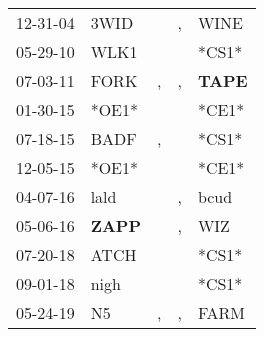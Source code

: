 \begin{supertabular}{p{0.07\textwidth}p{0.06\textwidth}p{0.02\textwidth}p{0.02\textwidth}p{0.06\textwidth}}
 12-31-04\textsuperscript{} &           3WID\textsuperscript{} &    &  , &           WINE\textsuperscript{} \\
 05-29-10\textsuperscript{} &           WLK1\textsuperscript{} &    &    &                            *CS1* \\
 07-03-11\textsuperscript{} &           FORK\textsuperscript{} &  , &  , &  \textbf{TAPE\textsuperscript{}} \\
 01-30-15\textsuperscript{} &                            *OE1* &    &    &                            *CE1* \\
 07-18-15\textsuperscript{} &           BADF\textsuperscript{} &  , &    &                            *CS1* \\
 12-05-15\textsuperscript{} &                            *OE1* &    &    &                            *CE1* \\
 04-07-16\textsuperscript{} &           lald\textsuperscript{} &    &  , &           bcud\textsuperscript{} \\
 05-06-16\textsuperscript{} &  \textbf{ZAPP\textsuperscript{}} &    &  , &            WIZ\textsuperscript{} \\
 07-20-18\textsuperscript{} &           ATCH\textsuperscript{} &    &    &                            *CS1* \\
 09-01-18\textsuperscript{} &           nigh\textsuperscript{} &    &    &                            *CS1* \\
 05-24-19\textsuperscript{} &             N5\textsuperscript{} &  , &  , &           FARM\textsuperscript{} \\
\end{supertabular}
